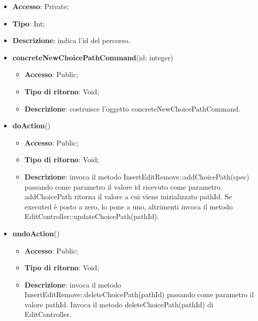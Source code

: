 {{{\begin{itemize}
			\begin{itemize}
				\item \textbf{Accesso}: Private;
				\item \textbf{Tipo}: Int;
				\item \textbf{Descrizione}: indica l'id del percorso.
			\end{itemize}
			\begin{itemize}
				\item \textbf{concreteNewChoicePathCommand}(id: integer)
				\begin{itemize}
					\item \textbf{Accesso}: Public;
					\item \textbf{Tipo di ritorno}: Void;
					\item \textbf{Descrizione}: costruisce l’oggetto concreteNewChoicePathCommand.
				\end{itemize}
				\item \textbf{doAction}()
				\begin{itemize}
					\item \textbf{Accesso}: Public;
					\item \textbf{Tipo di ritorno}: Void;
					\item \textbf{Descrizione}: invoca il metodo InsertEditRemove::addChoicePath(spec) passando come parametro il valore id ricevuto come parametro.  addChoicePath ritorna il valore a cui viene inizializzato pathId. Se executed è posto a zero, lo pone a uno, altrimenti invoca il metodo EditController::updateChoicePath(pathId).
				\end{itemize}
				\item \textbf{undoAction}()
				\begin{itemize}
					\item \textbf{Accesso}: Public;
					\item \textbf{Tipo di ritorno}: Void;
					\item \textbf{Descrizione}: invoca il metodo InsertEditRemove::deleteChoicePath(pathId) passando come parametro il valore pathId. Invoca il metodo deleteChoicePath(pathId) di EditController.
				\end{itemize}
			\end{itemize}
			


\end{itemize}}}}
